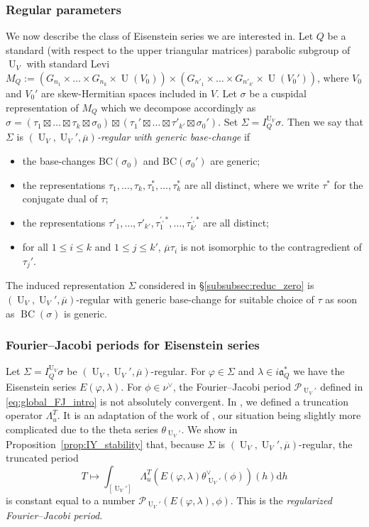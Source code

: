 \documentclass[letterpaper,11pt]{amsart}
\newcommand{\fa}{\mathfrak{a}}
\newcommand{\cP}{\mathcal{P}}
\newcommand{\rd}{\mathrm{d}}
\newcommand{\<}{\negthickspace}
\DeclareMathOperator{\U}{U}
\DeclareMathOperator{\BC}{BC}
\theoremstyle{definition}
\theoremstyle{plain}
\theoremstyle{remark}
\numberwithin{equation}{section}
\begin{document}
\subsubsection{Regular parameters}

We now describe the class of Eisenstein series we are interested in. Let $Q$ be a standard (with respect to the upper triangular matrices) parabolic subgroup of $\U_V$ with standard Levi $M_Q:=(G_{n_1} \times \hdots \times G_{n_k} \times \U(V_0)) \times (G_{n'_1} \times \hdots \times G_{n'_{k'}} \times \U(V_0'))$, where $V_0$ and $V_0'$ are skew-Hermitian spaces included in $V$. Let $\sigma$ be a cuspidal representation of $M_Q$ which we decompose accordingly as $\sigma=(\tau_1 \boxtimes \hdots \boxtimes \tau_k \boxtimes \sigma_0) \boxtimes (\tau_1' \boxtimes \hdots \boxtimes \tau'_{k'} \boxtimes \sigma_0')$. Set $\Sigma=I_Q^{\U_V} \sigma$. Then we say that $\Sigma$ is \emph{$(\U_V,\U_V',\overline{\mu})$-regular with generic base-change} if
\begin{itemize}
    \item the base-changes $\mathrm{BC}(\sigma_0)$ and $\mathrm{BC}(\sigma_0')$ are generic;
    \item the representations $\tau_1,\hdots,\tau_k, \tau_1^*, \hdots, \tau_k^*$ are all distinct, where we write $\tau^*$ for the conjugate dual of $\tau$;
    \item the representations $\tau'_1,\hdots,\tau'_{k'}, \tau_1^{',*}, \hdots, \tau_{k'}^{',*}$ are all distinct;
    \item for all $1 \leq i \leq k$ and $1 \leq j \leq k'$, $\overline{\mu} \tau_i$ is not isomorphic to the contragredient of $\tau_j'$.
\end{itemize}
The induced representation $\Sigma$ considered in \S\ref{subsubsec:reduc_zero} is $(\U_V,\U_V',\overline{\mu})$-regular with generic base-change for suitable choice of $\tau$ as soon as $\BC(\sigma)$ is generic.

\subsubsection{Fourier--Jacobi periods for Eisenstein series}

Let $\Sigma=I_Q^{\U_V} \sigma$ be $(\U_V,\U_V',\overline{\mu})$-regular. For $\varphi \in \Sigma$ and $\lambda \in i \fa_Q^*$ we have the Eisenstein series $E(\varphi,\lambda)$. For $\phi \in \nu^\vee$, the Fourier--Jacobi period $\cP_{\U_V'}$ defined in \eqref{eq:global_FJ_intro} is not absolutely convergent. In \cite{BLX1}, we defined a truncation operator $\Lambda^T_u$. It is an adaptation of the work of \cite{IY2}, our situation being slightly more complicated due to the theta series $\theta_{\U_V'}$. We show in Proposition~\ref{prop:IY_stability} that, because $\Sigma$ is $(\U_V,\U_V',\overline{\mu})$-regular, the truncated period 
\begin{equation*}
    T \mapsto \int_{[\U_V']} \Lambda^T_u \left(E(\varphi,\lambda) \theta_{\U_V'}^\vee(\phi) \right)(h) \rd h
\end{equation*}
is constant equal to a number $\cP_{\U_V'}(E(\varphi,\lambda),\phi)$. This is the \emph{regularized Fourier--Jacobi period}.
\end{document}

